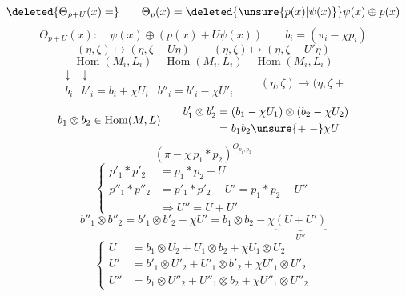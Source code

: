 \[
\deleted{\Theta_{p+U}(x)=}\qquad
\Theta_p(x)=\deleted{\unsure{p(x)|\psi(x)}}\psi(x)\oplus p(x)
\]
\[
\Theta_{p+U}(x):\quad\psi(x)\oplus(p(x)+U\psi(x))
\qquad\boxed{b_i=(\pi_i-\chi p_i)}
\]
\[
(\eta,\zeta)\longmapsto(\eta,\zeta-U\eta)
\qquad(\eta,\zeta)\longmapsto(\eta,\zeta-U'\eta)
\]
\[
\operatorname{Hom}(M_i,L_i)\quad
\operatorname{Hom}(M_i,L_i)\quad\operatorname{Hom}(M_i,L_i)
\]
\[
\begin{array}{ccc}
\downarrow&\downarrow&\\
b_i&b'_i=b_i+\chi U_i&b''_i=b'_i-\chi U'_i
\end{array}
\qquad(\eta,\zeta)\longrightarrow(\eta,\zeta+
\]
\[
b_1\otimes b_2\in\operatorname{Hom}(M,L)
\qquad
\begin{aligned}
b'_1\otimes b'_2&=(b_1-\chi U_1)\otimes(b_2-\chi U_2)\\
&=b_1b_2\unsure{+|-}\chi U
\end{aligned}
\]
\[
(\pi-\chi\,p_1*p_2)^{\Theta_{p_1,p_2}}
\]
\[
\left\{\begin{aligned}
p'_1*p'_2&=p_1*p_2-U\\
p''_1*p''_2&=p'_1*p'_2-U'=p_1*p_2-U''\\
&\Longrightarrow U''=U+U'
\end{aligned}\right.
\]
\[
b''_1\otimes b''_2=b'_1\otimes b'_2-\chi U'
=b_1\otimes b_2-\chi\underbrace{(U+U')}_{U''}
\]
\[
\left\{\begin{aligned}
U&=b_1\otimes U_2+U_1\otimes b_2+\chi U_1\otimes U_2\\
U'&=b'_1\otimes U'_2+U'_1\otimes b'_2+\chi U'_1\otimes U'_2\\
U''&=b_1\otimes U''_2+U''_1\otimes b_2+\chi U''_1\otimes U''_2
\end{aligned}\right.
\]
